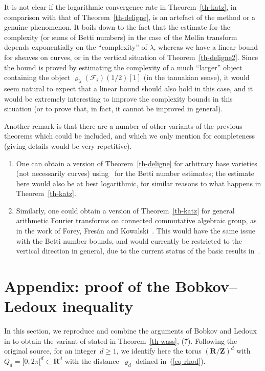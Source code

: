 \documentclass[12pt]{amsart}
\renewcommand{\mathcal}{\mathscr}
\renewcommand{\geq}{\geqslant}
\newcommand{\Zz}{\mathbf{Z}}
\newcommand{\Rr}{\mathbf{R}}
\renewcommand{\rho}{\varrho}
\theoremstyle{plain}
\theoremstyle{remark}
\theoremstyle{definition}
\renewcommand{\geq}{\geqslant}
\begin{document}
It is not clear if the logarithmic convergence rate in
Theorem~\ref{th-katz}, in comparison with that of
Theorem~\ref{th-deligne}, is an artefact of the method or a genuine
phenomenon.  It boils down to the fact that the estimate for the
complexity (or sums of Betti numbers) in the case of the Mellin
transform depends exponentially on the ``complexity'' of $\lambda$,
whereas we have a linear bound for sheaves on curves, or in the
vertical situation of Theorem~\ref{th-deligne2}.  Since the bound is
proved by estimating the complexity of a much ``larger'' object
containing the object $\rho_{\lambda}(\mathcal{F}_i)(1/2)[1]$ (in the
tannakian sense), it would seem natural to expect that a linear bound
should also hold in this case, and it would be extremely interesting
to improve the complexity bounds in this situation (or to prove that,
in fact, it cannot be improved in general).

Another remark is that there are a number of other variants of the
previous theorems which could be included, and which we only mention for
completeness (giving details would be very repetitive).

\begin{enumerate}
\item One can obtain a version of Theorem~\ref{th-deligne} for arbitrary
  base varieties (not necessarily curves) using~\cite[Prop.\,6.33]{sffk}
  for the Betti number estimates; the estimate here would also be at
  best logarithmic, for similar reasons to what happens in
  Theorem~\ref{th-katz}.
\item Similarly, one could obtain a version of Theorem~\ref{th-katz} for
  general arithmetic Fourier transforms on connected commutative
  algebraic group, as in the work of Forey, Fresán and
  Kowalski~\cite[Ch.\,4]{ffk}. This would have the same issue with the
  Betti number bounds, and would currently be restricted to the vertical
  direction in general, due to the current status of the basic results
  in~\cite{ffk}.
\end{enumerate}

\section*{Appendix: proof of the Bobkov--Ledoux inequality}
\label{sec: appendix proof}

In this section, we reproduce and combine the arguments of Bobkov and
Ledoux in \cite{bl_truncated,bl_gaussian} to obtain the variant of
\cite[Eq. (1.6)]{bl_truncated} stated in Theorem~\ref{th-wass},
(7). Following the original source, for an integer~$d\geq 1$, we
identify here the torus $(\Rr/\Zz)^d$ with $Q_d=[0,2\pi[^d\subset\Rr^d$
with the distance~$\rho_d$ defined in~(\ref{eq-rhod}).
\end{document}
